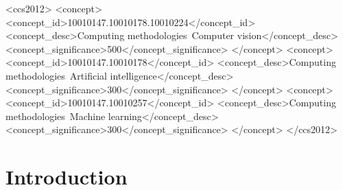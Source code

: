 \documentclass[sigconf]{acmart}
\begin{document}
\begin{CCSXML}
<ccs2012>
   <concept>
       <concept_id>10010147.10010178.10010224</concept_id>
       <concept_desc>Computing methodologies~Computer vision</concept_desc>
       <concept_significance>500</concept_significance>
       </concept>
   <concept>
       <concept_id>10010147.10010178</concept_id>
       <concept_desc>Computing methodologies~Artificial intelligence</concept_desc>
       <concept_significance>300</concept_significance>
       </concept>
   <concept>
       <concept_id>10010147.10010257</concept_id>
       <concept_desc>Computing methodologies~Machine learning</concept_desc>
       <concept_significance>300</concept_significance>
       </concept>
 </ccs2012>
\end{CCSXML}






\maketitle

\section{Introduction}
\end{document}
